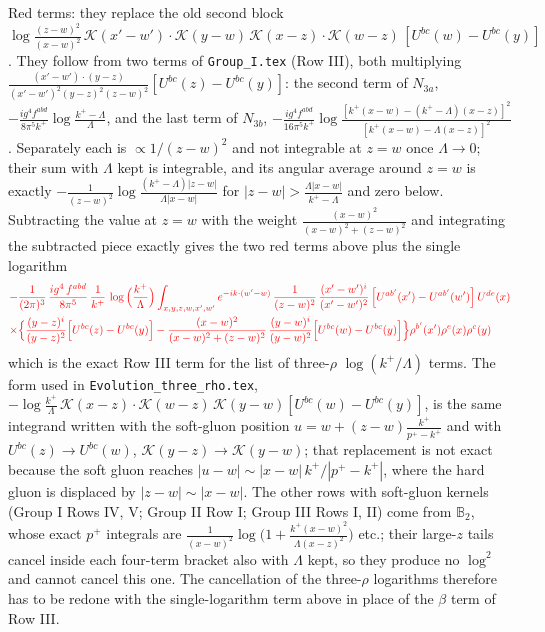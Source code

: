 \documentclass[9pt]{article}
\def\mf#1{\mathbb{#1}}
\numberwithin{equation}{section}
\begin{document}
{\color{red}Red terms: they replace the old second block $\log\frac{(z-w)^{2}}{(x-w)^{2}}\,\mathcal{K}(x'-w')\cdot\mathcal{K}(y-w)\,\mathcal{K}(x-z)\cdot\mathcal{K}(w-z)\,[U^{bc}(w)-U^{bc}(y)]$. They follow from two terms of \texttt{Group\_I.tex} (Row III), both multiplying $\frac{(x'-w')\cdot(y-z)}{(x'-w')^{2}(y-z)^{2}(z-w)^{2}}[U^{bc}(z)-U^{bc}(y)]$: the second term of $N_{3a}$, $-\frac{ig^{4}f^{abd}}{8\pi^{5}k^{+}}\log\frac{k^{+}-\Lambda}{\Lambda}$, and the last term of $N_{3b}$, $-\frac{ig^{4}f^{abd}}{16\pi^{5}k^{+}}\log\frac{[k^{+}(x-w)-(k^{+}-\Lambda)(x-z)]^{2}}{[k^{+}(x-w)-\Lambda(x-z)]^{2}}$. Separately each is $\propto1/(z-w)^{2}$ and not integrable at $z=w$ once $\Lambda\to0$; their sum with $\Lambda$ kept is integrable, and its angular average around $z=w$ is exactly $-\frac{1}{(z-w)^{2}}\log\frac{(k^{+}-\Lambda)|z-w|}{\Lambda|x-w|}$ for $|z-w|>\frac{\Lambda|x-w|}{k^{+}-\Lambda}$ and zero below. Subtracting the value at $z=w$ with the weight $\frac{(x-w)^{2}}{(x-w)^{2}+(z-w)^{2}}$ and integrating the subtracted piece exactly gives the two red terms above plus the single logarithm}
\begin{align}
&{\color{red}-\frac{1}{(2\pi)^{3}}\,\frac{ig^{4}\,f^{abd}}{8\pi^{5}}\,\frac{1}{k^{+}}\,\log\Big(\frac{k^{+}}{\Lambda}\Big)\int_{x,y,z,w,x',w'}e^{-ik\cdot(w'-w)}\,\frac{1}{(z-w)^{2}}\,\frac{(x'-w')^{i}}{(x'-w')^{2}}\,\Big[U^{ab'}(x')-U^{ab'}(w')\Big]\,U^{de}(x)}\notag\\
&{\color{red}\times\Big\{\frac{(y-z)^{i}}{(y-z)^{2}}\Big[U^{bc}(z)-U^{bc}(y)\Big]-\frac{(x-w)^{2}}{(x-w)^{2}+(z-w)^{2}}\,\frac{(y-w)^{i}}{(y-w)^{2}}\Big[U^{bc}(w)-U^{bc}(y)\Big]\Big\}\rho^{b'}(x')\rho^{e}(x)\rho^{c}(y)}\notag
\end{align}
{\color{red}which is the exact Row III term for the list of three-$\rho$ $\log(k^{+}/\Lambda)$ terms. The form used in \texttt{Evolution\_three\_rho.tex}, $-\log\frac{k^{+}}{\Lambda}\,\mathcal{K}(x-z)\cdot\mathcal{K}(w-z)\,\mathcal{K}(y-w)[U^{bc}(w)-U^{bc}(y)]$, is the same integrand written with the soft-gluon position $u=w+(z-w)\frac{k^{+}}{p^{+}-k^{+}}$ and with $U^{bc}(z)\to U^{bc}(w)$, $\mathcal{K}(y-z)\to\mathcal{K}(y-w)$; that replacement is not exact because the soft gluon reaches $|u-w|\sim|x-w|\,k^{+}/|p^{+}-k^{+}|$, where the hard gluon is displaced by $|z-w|\sim|x-w|$. The other rows with soft-gluon kernels (Group I Rows IV, V; Group II Row I; Group III Rows I, II) come from $\mf{B}_{2}$, whose exact $p^{+}$ integrals are $\frac{1}{(x-w)^{2}}\log\big(1+\frac{k^{+}(x-w)^{2}}{\Lambda(x-z)^{2}}\big)$ etc.; their large-$z$ tails cancel inside each four-term bracket also with $\Lambda$ kept, so they produce no $\log^{2}$ and cannot cancel this one. The cancellation of the three-$\rho$ logarithms therefore has to be redone with the single-logarithm term above in place of the $\beta$ term of Row III.}
\end{document}
